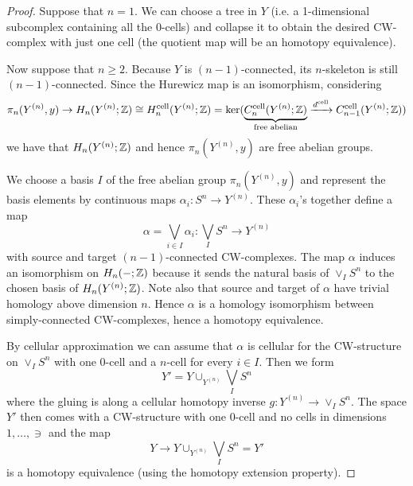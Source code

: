 \begin{proof}
Suppose that $n=1$. We can choose a tree in $Y$ (i.e. a 1-dimensional subcomplex containing all the $0$-cells) and collapse it to obtain the desired CW-complex with just one cell (the quotient map will be an homotopy equivalence).

Now suppose that $n\ge2$. Because $Y$ is $(n-1)$-connected, its $n$-skeleton is still $(n-1)$-connected. Since the Hurewicz map is an isomorphism, considering
\[\pi_n(Y^{(n)},y)\to H_n(Y^{(n)};{\mathbb Z})\cong H^\text{cell}_n(Y^{(n)};{\mathbb Z})=\ker(\underbrace{C^\text{cell}_n(Y^{(n)};{\mathbb Z})}_{\text{free abelian}}\xrightarrow{d^\text{cell}}C^\text{cell}_{n-1}(Y^{(n)};{\mathbb Z}))\]
we have that $H_n(Y^{(n)};{\mathbb Z})$ and hence $\pi_n(Y^{(n)},y)$ are free abelian groups.

We choose a basis $I$ of the free abelian group $\pi_n(Y^{(n)},y)$ and represent the basis elements by continuous maps $\alpha_i:S^n\to Y^{(n)}$. These $\alpha_i$'s together define a map
\[\alpha=\bigvee_{i\in I}\alpha_i:\bigvee_I S^n\to Y^{(n)}\]
with source and target $(n-1)$-connected CW-complexes. The map $\alpha$ induces an isomorphism on $H_n(-;{\mathbb Z})$ because it sends the natural basis of $\vee_I S^n$ to the chosen basis of $H_n(Y^{(n)};{\mathbb Z})$. Note also that source and target of $\alpha$ have trivial homology above dimension $n$. Hence $\alpha$ is a homology isomorphism between simply-connected CW-complexes, hence a homotopy equivalence.

By cellular approximation we can assume that $\alpha$ is cellular for the CW-structure on $\vee_I S^n$ with one $0$-cell and a $n$-cell for every $i\in I$. Then we form
\[Y'=Y\cup_{Y^{(n)}}\bigvee_I S^n\]
where the gluing is along a cellular homotopy inverse $g:Y^{(n)}\to \vee_I S^n$. The space $Y'$ then comes with a CW-structure with one $0$-cell and no cells in dimensions $1,\dots,\ni$ and the map
\[Y\to Y\cup_{Y^{(n)}}\bigvee_I S^n=Y'\]
is a homotopy equivalence (using the homotopy extension property).
\end{proof}
